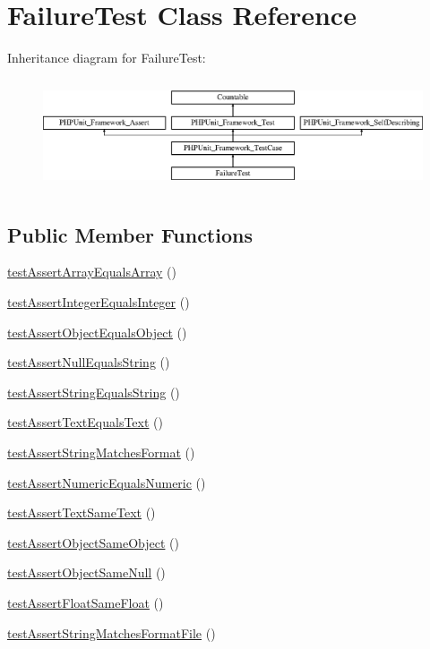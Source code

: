 \hypertarget{class_failure_test}{}\section{Failure\+Test Class Reference}
\label{class_failure_test}
Inheritance diagram for Failure\+Test\+:\begin{figure}[H]
\begin{center}
\leavevmode
\includegraphics[height=3.303835cm]{class_failure_test}
\end{center}
\end{figure}
\subsection*{Public Member Functions}
\begin{DoxyCompactItemize}
\item 
\mbox{\hyperlink{class_failure_test_a98a151dec79e93afb882b009c87451f9}{test\+Assert\+Array\+Equals\+Array}} ()
\item 
\mbox{\hyperlink{class_failure_test_a279ed902884181d76523cc2c14126c83}{test\+Assert\+Integer\+Equals\+Integer}} ()
\item 
\mbox{\hyperlink{class_failure_test_a0c176ae8834da351da788240faa06f8a}{test\+Assert\+Object\+Equals\+Object}} ()
\item 
\mbox{\hyperlink{class_failure_test_a4ae262fc49aa3feeac34b1bc53a24012}{test\+Assert\+Null\+Equals\+String}} ()
\item 
\mbox{\hyperlink{class_failure_test_aa472cf9bde2b4a60fe58922dec14c9a1}{test\+Assert\+String\+Equals\+String}} ()
\item 
\mbox{\hyperlink{class_failure_test_acc0b1f433e6bb896b822a9495e9c8651}{test\+Assert\+Text\+Equals\+Text}} ()
\item 
\mbox{\hyperlink{class_failure_test_a9b2db252f130a595084a01c466e571cd}{test\+Assert\+String\+Matches\+Format}} ()
\item 
\mbox{\hyperlink{class_failure_test_ae9344dd6b9740bb479a9d8137b51f137}{test\+Assert\+Numeric\+Equals\+Numeric}} ()
\item 
\mbox{\hyperlink{class_failure_test_ac057c8d7a9ead4af51487fe3c34b40f2}{test\+Assert\+Text\+Same\+Text}} ()
\item 
\mbox{\hyperlink{class_failure_test_a2eef240d2f715b971a23c660776f77b4}{test\+Assert\+Object\+Same\+Object}} ()
\item 
\mbox{\hyperlink{class_failure_test_a091162b13b298a4e9e186a2a85147c73}{test\+Assert\+Object\+Same\+Null}} ()
\item 
\mbox{\hyperlink{class_failure_test_af8dde15e6f125a0f21a9ef8d002835d9}{test\+Assert\+Float\+Same\+Float}} ()
\item 
\mbox{\hyperlink{class_failure_test_a173a96eab8a73d1e09abb15bc38301e9}{test\+Assert\+String\+Matches\+Format\+File}} ()
\end{DoxyCompactItemize}
